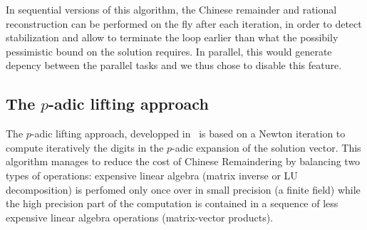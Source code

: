 In sequential versions of this algorithm, the Chinese remainder and rational reconstruction can be performed on the fly
after each iteration, in order to detect stabilization and allow to terminate the loop earlier than what the possibily
pessimistic bound on the solution requires. In parallel, this would generate depency between the parallel tasks and we
thus chose to disable this feature.


\subsection{The $p$-adic lifting approach}

The $p$-adic lifting approach, developped in~\cite{Dix82} is based on a Newton iteration to compute iteratively the
digits in the $p$-adic expansion of the solution vector. This algorithm manages to reduce the cost of Chinese Remaindering
by balancing two types of operations: expensive linear algebra (matrix inverse or LU decomposition) is
perfomed only once over in small precision (a finite field) while the high precision part of the computation is
contained in a sequence of less expensive linear algebra operations (matrix-vector products).

